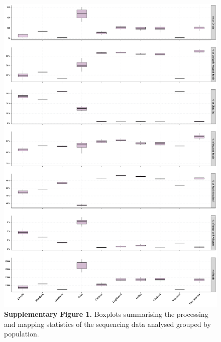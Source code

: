 \documentclass[twoside, british, a4paper]{article}
\begin{document}
\begin{figure}
\centering
\includegraphics[width=1\textwidth]{../Y150239Genomics--Pipeline/Y150239Genomics--Plots/Y150239Genomics--Stats/Y150239Genomics--Stats.pdf}
\captionsetup{labelformat=empty}
\caption[\textbf{Supplementary Figure 1.}]{\textbf{Supplementary Figure 1.} Boxplots summarising the processing and mapping statistics of the sequencing data analysed grouped by population.}
\label{SI:Y150239Genomics--Stats}
\end{figure}
\end{document}
